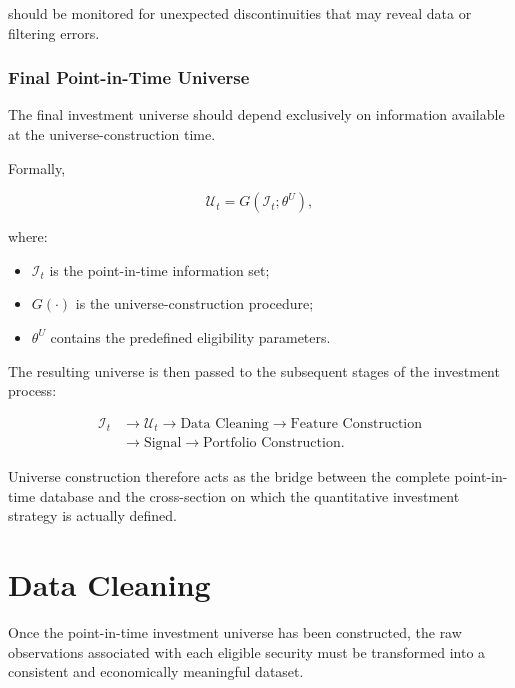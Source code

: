\documentclass[11pt,a4paper]{article}
\begin{document}
should be monitored for unexpected discontinuities that may reveal data or
filtering errors.


\subsubsection{Final Point-in-Time Universe}

The final investment universe should depend exclusively on information
available at the universe-construction time.

Formally,

\begin{equation}
\boxed{
\mathcal{U}_t
=
G
\left(
\mathcal{I}_t;
\theta^{U}
\right),
}
\end{equation}

where:

\begin{itemize}
    \item $\mathcal{I}_t$ is the point-in-time information set;
    \item $G(\cdot)$ is the universe-construction procedure;
    \item $\theta^{U}$ contains the predefined eligibility parameters.
\end{itemize}

The resulting universe is then passed to the subsequent stages of the
investment process:

\begin{equation}
\boxed{
\begin{aligned}
\mathcal{I}_t
&\rightarrow
\mathcal{U}_t
\rightarrow
\text{Data Cleaning}
\rightarrow
\text{Feature Construction}
\\[0.15cm]
&\rightarrow
\text{Signal}
\rightarrow
\text{Portfolio Construction}.
\end{aligned}
}
\end{equation}

Universe construction therefore acts as the bridge between the complete
point-in-time database and the cross-section on which the quantitative
investment strategy is actually defined.


\section{Data Cleaning}
\label{sec:data_cleaning}

Once the point-in-time investment universe has been constructed, the raw
observations associated with each eligible security must be transformed into a
consistent and economically meaningful dataset.
\end{document}
